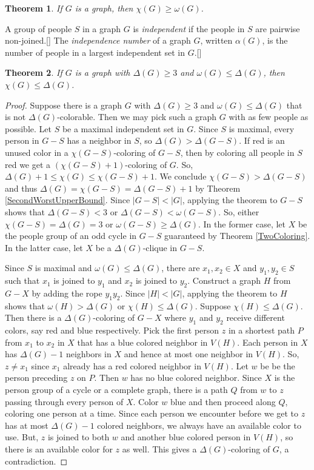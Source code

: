 \documentclass{amsbook}
\newcommand{\aaside}[2]{\marginnote{\scriptsize{#1}}[#2]}
\theoremstyle{plain}
\newtheorem{theorem}{Theorem}
\numberwithin{equation}{chapter}
\newcommand{\card}[1]{\left|#1\right|}
\newcommand{\parens}[1]{\left( #1 \right)}
\begin{document}
\begin{theorem}\label{OmegaLowerBound}
If $G$ is a graph, then $\chi(G) \ge \omega(G)$.
\end{theorem}

A group of people $S$ in a graph $G$ is \emph{independent} if the people in $S$ are pairwise non-joined.\aaside{independent}{}  
The \emph{independence number} of a graph $G$, written $\alpha(G)$, is the number of people in a largest independent set in $G$.\aaside{$\alpha(G)$}{}

\begin{theorem}
If $G$ is a graph with $\Delta(G) \ge 3$ and $\omega(G) \le \Delta(G)$, then $\chi(G) \le \Delta(G)$.
\label{BrooksTheorem}
\end{theorem}
\begin{proof}
Suppose there is a graph $G$ with $\Delta(G) \ge 3$ and $\omega(G) \le \Delta(G)$ that is not $\Delta(G)$-colorable.  
Then we may pick such a graph $G$ with as few people as possible.  Let $S$ be 
a maximal independent set in $G$.  Since $S$ is maximal, every person in $G-S$ has a neighbor in $S$, so $\Delta(G) > \Delta(G-S)$.
If red is an unused color in a $\chi(G-S)$-coloring of $G-S$, then by coloring all people in $S$ red we get a $\parens{\chi(G-S)+1}$-coloring of $G$.  
So, $\Delta(G) + 1 \le \chi(G) \le \chi(G-S) + 1$. We conclude $\chi(G-S) > \Delta(G - S)$ and thus $\Delta(G) = \chi(G-S) = \Delta(G-S) + 1$ by Theorem \ref{SecondWorstUpperBound}.
Since $\card{G-S} < \card{G}$, applying the theorem to $G-S$ shows that $\Delta(G-S) < 3$ or $\Delta(G -S) < \omega(G - S)$.  
So, either $\chi(G-S) = \Delta(G) = 3$ or $\omega(G-S) \ge \Delta(G)$.  In the former case, let $X$ be the people group of an odd cycle in $G-S$ guaranteed by Theorem \ref{TwoColoring}.  
In the latter case, let $X$ be a $\Delta(G)$-clique in $G-S$.

Since $S$ is maximal and $\omega(G) \le \Delta(G)$, there are $x_1, x_2 \in X$ and $y_1, y_2 \in S$ such that $x_1$ is joined to $y_1$ and $x_2$ is joined to $y_2$.
Construct a graph $H$ from $G-X$ by adding the rope $y_1y_2$.  Since $\card{H} < \card{G}$, applying the theorem to $H$ shows that $\omega(H) > \Delta(G)$ or $\chi(H) \le \Delta(G)$.
Suppose $\chi(H) \le \Delta(G)$.  Then there is a $\Delta(G)$-coloring of $G-X$ where $y_1$ and $y_2$ receive different colors, say red and blue respectively.
Pick the first person $z$ in a shortest path $P$ from $x_1$ to $x_2$ in $X$ that has a blue colored neighbor in $V(H)$. 
Each person in $X$ has $\Delta(G)-1$ neighbors in $X$ and hence at most one neighbor in $V(H)$.  So, $z \ne x_1$ since $x_1$ already has a red colored neighbor in $V(H)$.
Let $w$ be be the person preceding $z$ on $P$. Then $w$ has no blue colored neighbor.  Since $X$ is the person group of a cycle or a 
complete graph, there is a path $Q$ from $w$ to $z$ passing through every person of $X$.  Color $w$ blue and then proceed along $Q$, coloring one person at a time.  
Since each person we encounter before we get to $z$ has at most $\Delta(G) - 1$ colored neighbors, we always have an available color to use.  But, $z$ is joined
to both $w$ and another blue colored person in $V(H)$, so there is an available color for $z$ as well.  This gives a $\Delta(G)$-coloring of $G$, a contradiction.


\end{proof}
\end{document}
